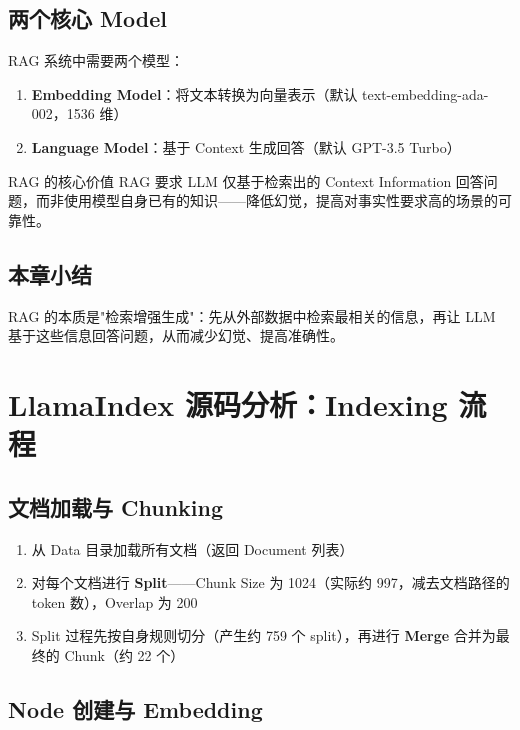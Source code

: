 \documentclass[a4paper]{article}
\begin{document}
\subsection{两个核心 Model}

RAG 系统中需要两个模型：
\begin{enumerate}
    \item \textbf{Embedding Model}：将文本转换为向量表示（默认 text-embedding-ada-002，1536 维）
    \item \textbf{Language Model}：基于 Context 生成回答（默认 GPT-3.5 Turbo）
\end{enumerate}

\begin{knowledgebox}{RAG 的核心价值}
RAG 要求 LLM 仅基于检索出的 Context Information 回答问题，而非使用模型自身已有的知识——降低幻觉，提高对事实性要求高的场景的可靠性。
\end{knowledgebox}

\subsection{本章小结}

RAG 的本质是"检索增强生成"：先从外部数据中检索最相关的信息，再让 LLM 基于这些信息回答问题，从而减少幻觉、提高准确性。

\section{LlamaIndex 源码分析：Indexing 流程}

\subsection{文档加载与 Chunking}

\begin{enumerate}
    \item 从 Data 目录加载所有文档（返回 Document 列表）
    \item 对每个文档进行 \textbf{Split}——Chunk Size 为 1024（实际约 997，减去文档路径的 token 数），Overlap 为 200
    \item Split 过程先按自身规则切分（产生约 759 个 split），再进行 \textbf{Merge} 合并为最终的 Chunk（约 22 个）
\end{enumerate}

\subsection{Node 创建与 Embedding}
\end{document}
